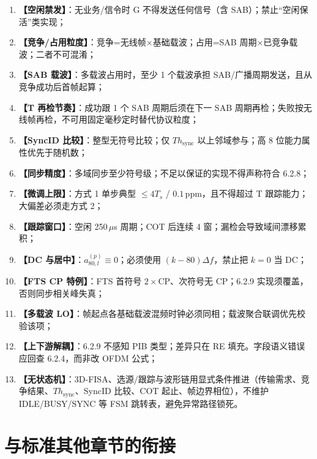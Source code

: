 \documentclass[11pt,a4paper]{ctexart}
\begin{document}
\begin{enumerate}[nosep]
  \item \textbf{【空闲禁发】}：无业务/信令时 G 不得发送任何信号（含 SAB）；禁止``空闲保活''类实现；
  \item \textbf{【竞争/占用粒度】}：竞争=无线帧$\times$基础载波；占用=SAB 周期$\times$已竞争载波；二者不可混淆；
  \item \textbf{【SAB 载波】}：多载波占用时，至少 1 个载波承担 SAB/广播周期发送，且从竞争成功后首帧起算；
  \item \textbf{【T 再检节奏】}：成功跟 1 个 SAB 周期后须在下一 SAB 周期再检；失败按无线帧再检，不可用固定毫秒定时替代协议粒度；
  \item \textbf{【SyncID 比较】}：整型无符号比较；仅 $Th_{\mathrm{sync}}$ 以上邻域参与；高 8 位能力属性优先于随机数；
  \item \textbf{【同步精度】}：多域同步至少符号级；不足以保证的实现不得声称符合 6.2.8；
  \item \textbf{【微调上限】}：方式 1 单步典型 $\le 4T_s$ / $0.1$\,ppm，且不得超过 T 跟踪能力；大偏差必须走方式 2；
  \item \textbf{【跟踪窗口】}：空闲 250\,$\mu$s 周期；COT 后连续 4 窗；漏检会导致域间漂移累积；
  \item \textbf{【DC 与居中】}：$a_{80,l}^{(p)}{\equiv}0$；必须使用 $(k{-}80)\Delta f$，禁止把 $k{=}0$ 当 DC；
  \item \textbf{【FTS CP 特例】}：FTS 首符号 $2\times$CP、次符号无 CP；6.2.9 实现须覆盖，否则同步相关峰失真；
  \item \textbf{【多载波 LO】}：帧起点各基础载波混频时钟必须同相；载波聚合联调优先校验该项；
  \item \textbf{【上下游解耦】}：6.2.9 不感知 PIB 类型；差异只在 RE 填充。字段语义错误应回查 6.2.4，而非改 OFDM 公式；
  \item \textbf{【无状态机】}：3D-FISA、选源/跟踪与波形链用显式条件推进（传输需求、竞争结果、$Th_{\mathrm{sync}}$、SyncID 比较、COT 起止、帧边界相位），不维护 IDLE/BUSY/SYNC 等 FSM 跳转表，避免异常路径锁死。
\end{enumerate}

\section{与标准其他章节的衔接}
\end{document}
